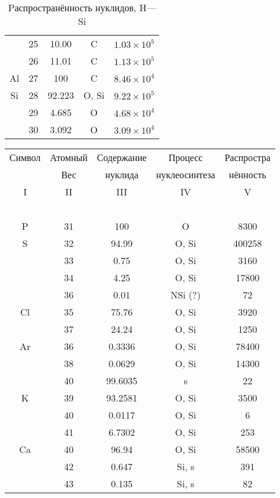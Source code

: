 \documentclass[a5paper,openany]{book}
\begin{document}
\begin{table}[h!]
{\begin{tabular}{ccccc}
			& 25 & 10.00 & C & $1.03 \times 10^{5}$ \\ [1mm] 			
			& 26 & 11.01 & C & $1.13 \times 10^{5}$ \\ [1mm] 
			Al & 27 & 100 & C &   $8.46 \times 10^{4}$ \\ [1mm] 
			Si & 28 & 92.223 & O, Si &  $9.22 \times 10^{5}$ \\ [1mm]
			& 29 & 4.685 & O & $4.68 \times 10^{4}$ \\ [1mm] 			
			& 30 & 3.092 & O & $3.09 \times 10^{4}$ \\ [1mm] 
			\hline 
		\end{tabular}
	}
	\caption{Pаспространённость нуклидов, H---Si}
	\label{t:AbudanceSolarHSi}
\end{table} 

\begin{table}[h!]
	{\small
		\begin{tabular}{ccccc}
			Символ  & Атомный &  Содержание  & Процесс & Распростра   \\
			~ & Вес &  нуклида  &  нуклеосинтеза  & нённость  \\
			\hline 
			I & II &  III  & IV & V \\
			\hline 
			~ & ~ & ~ & ~ & ~  \\
			P & 31 & 100 & O  &  8300 \\ [1mm]
			S & 32 & 94.99 & O, Si & 400258 \\ [1mm]
			& 33 & 0.75 & O, Si & 3160 \\ [1mm] 			
			& 34 & 4.25 & O, Si & 17800\\ [1mm] 
			& 36 & 0.01 & NSi (?) & 72 \\ [1mm]
			Cl & 35 & 75.76 & O, Si &  3920 \\ [1mm]
			& 37 & 24.24 & O, Si & 1250 \\ [1mm] 
			Ar & 36 & 0.3336 & O, Si &  78400 \\ [1mm]
			& 38 & 0.0629 & O, Si & 14300 \\ [1mm] 			
			& 40 & 99.6035 & s & 22\\ [1mm] 
			\hline
			K & 39 & 93.2581 & O, Si &  3500 \\ [1mm]
			& 40 & 0.0117 & O, Si & 6 \\ [1mm] 			
			& 41 & 6.7302 & O, Si  & 253\\ [1mm] 	
			Ca & 40 & 96.94 & O, Si &  58500 \\ [1mm]
			& 42 & 0.647 & Si, s & 391 \\ [1mm] 			
			& 43 & 0.135 & Si, s  & 82\\ [1mm] 

\end{tabular}}
\end{table}
\end{document}
